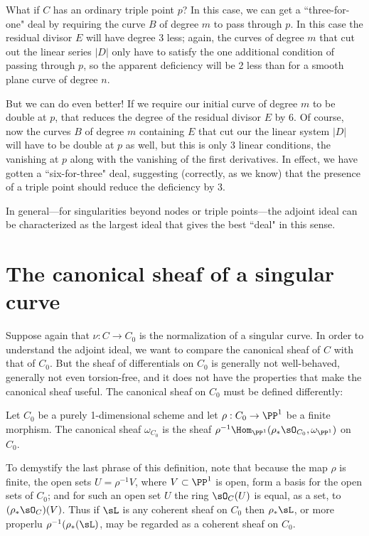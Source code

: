 What if $C$ has an ordinary triple point $p$? In this case, we can get a ``three-for-one" deal by requiring the curve $B$ of degree $m$ to pass through $p$. In this case the residual divisor $E$ will have degree 3 less; again, the curves of degree $m$ that cut out the linear series $|D|$ only have to satisfy the one additional condition of passing through $p$, so the apparent deficiency will be 2 less than for a smooth plane curve of degree $n$.

But we can do even better! If we require our initial curve of degree $m$ to be double at $p$, that reduces the degree of the residual divisor $E$  by 6. Of course, now the curves $B$ of degree $m$ containing $E$ that cut our the linear system $|D|$  will have to be double at $p$ as well, but this is only 3 linear conditions, the vanishing at $p$ along with the vanishing of the first derivatives. In effect, we have gotten a ``six-for-three" deal, suggesting (correctly, as we know) that the presence of a triple point should reduce the deficiency by 3. 

In general---for singularities beyond nodes or triple points---the adjoint ideal can be characterized as the largest ideal that gives the best ``deal" in this sense. 


\section{The canonical sheaf of a singular curve}

Suppose again that $\nu:C\to C_0$ is the normalization of a singular curve. In order to understand the adjoint ideal, we 
want to compare the canonical sheaf of $C$ with
that of $C_0$. But the sheaf of differentials on $C_0$ is generally not well-behaved, generally not even torsion-free,
 and it does not
have the properties that make the canonical sheaf useful. The canonical
sheaf on $C_0$ must be defined differently:

\begin{definition}\label{canonical as Hom}
Let $C_0$ be a purely 1-dimensional scheme and let $\rho: C_0\to \PP^1$ be a finite morphism. The canonical sheaf $\omega_{C_0}$
is the sheaf $\rho^{-1}\Hom_{\PP^1}(\rho_*\sO_{C_0}, \omega_{\PP^1})$ on $C_0$. 
\end{definition}

To demystify the last phrase of this definition, note that because the map
$\rho$ is finite,  the open sets $U = \rho^{-1}V$, where $V\subset \PP^1$ is open, form a basis for the open sets of $C_0$; and for
such an open set $U$ the ring $\sO_C(U)$ is equal, as a set, to 
$(\rho_*\sO_C)(V)$. Thus if $\sL$ is any coherent sheaf on $C_0$ then $\rho_*\sL$, or more properlu $\rho^{-1}(\rho_*(\sL)$,
may be regarded as a coherent sheaf on $C_0$.

